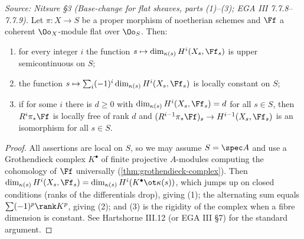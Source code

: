 \begin{theorem}
  \label{thm:semicontinuity}
  \textit{Source: Nitsure §3 (Base-change for flat sheaves, parts (1)--(3); EGA III 7.7.8--7.7.9).}
  Let $\pi\colon X\to S$ be a proper morphism of noetherian schemes and $\Ff$ a
  coherent $\Oo_X$-module flat over $\Oo_S$. Then:
  \begin{enumerate}
    \item for every integer $i$ the function
      $s\mapsto\dim_{\kappa(s)}H^i(X_s,\Ff_s)$ is upper semicontinuous on $S$;
    \item the function $s\mapsto\sum_i(-1)^i\dim_{\kappa(s)}H^i(X_s,\Ff_s)$ is
      locally constant on $S$;
    \item if for some $i$ there is $d\ge 0$ with
      $\dim_{\kappa(s)}H^i(X_s,\Ff_s)=d$ for all $s\in S$, then $R^i\pi_*\Ff$ is
      locally free of rank $d$ and $(R^{i-1}\pi_*\Ff)_s\to H^{i-1}(X_s,\Ff_s)$ is
      an isomorphism for all $s\in S$.
  \end{enumerate}
\end{theorem}

\begin{proof}
  All assertions are local on $S$, so we may assume $S=\spec A$ and use a
  Grothendieck complex $K^\bullet$ of finite projective $A$-modules computing the
  cohomology of $\Ff$ universally (\cref{thm:grothendieck-complex}). Then
  $\dim_{\kappa(s)}H^i(X_s,\Ff_s)=\dim_{\kappa(s)}H^i(K^\bullet\ot\kappa(s))$,
  which jumps up on closed conditions (ranks of the differentials drop), giving
  (1); the alternating sum equals $\sum(-1)^p\rank K^p$, giving (2); and (3) is
  the rigidity of the complex when a fibre dimension is constant. See Hartshorne
  III.12 (or EGA III §7) for the standard argument.
\end{proof}

